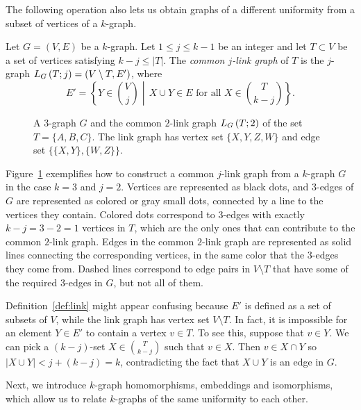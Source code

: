 The following operation also lets us obtain graphs of a
different uniformity from a subset of vertices of a $k$-graph.

\begin{definition} \label{def:link}
    Let $G = (V, E)$ be a $k$-graph.
    Let $1 \leq j \leq k - 1$ be an integer and let
    $T \subset V$ be a set of vertices satisfying $k - j \leq |T|$.
    The \emph{common $j$-link graph} of $T$ is the $j$-graph $L_{G}\left(T; j\right) = (V \setminus T, E')$, where
    \[
        E' = \left\{Y \in \binom{V}{j}\middle\vert \, X \cup Y \in E \text{ for all } X \in \binom{T}{k-j}\right\}.
    \]
\end{definition}

\begin{figure}[htbp]
    \centering
    
    \caption{A $3$-graph $G$ and the common $2$-link graph $L_{G}\left(T; 2\right)$ of the set $T = \{A, B, C\}$.
        The link graph has vertex set $\{X, Y, Z, W\}$ and edge set
        $\{\{X, Y\}, \{W, Z\}\}$.
    }
    \label{fig:link}
\end{figure}

Figure~\ref{fig:link} exemplifies how to construct
a common $j$-link graph from a $k$-graph $G$ in the case $k=3$ and $j=2$.
Vertices are represented as black dots, and $3$-edges of $G$ are represented as colored or gray small dots,
connected by a line to the vertices they contain.
Colored dots correspond to $3$-edges with exactly
$k - j = 3 - 2 = 1$ vertices in $T$, which are the only ones that can contribute to the common $2$-link graph.
Edges in the common $2$-link graph are represented as solid lines connecting the corresponding vertices,
in the same color that the $3$-edges they come from.
Dashed lines correspond to edge pairs
in $V \setminus T$ that have some of the required $3$-edges in $G$, but not all of them.

\begin{remark}
    Definition~\ref{def:link} might appear confusing because $E'$ is defined
    as a set of subsets of $V$, while the link graph has vertex set $V \setminus T$.
    In fact, it is impossible for an element $Y \in E'$ to contain a vertex $v \in T$.
    To see this, suppose that $v \in Y$.
    We can pick a $(k-j)$-set $X \in \binom{T}{k-j}$ such that $v \in X$.
    Then $v \in X \cap Y$ so
    $| X \cup Y | < j + (k-j) = k$, contradicting the fact that $X \cup Y$ is an edge in $G$.
\end{remark}

Next, we introduce $k$-graph homomorphisms, embeddings and isomorphisms, which allow us
to relate $k$-graphs of the same uniformity to each other.


